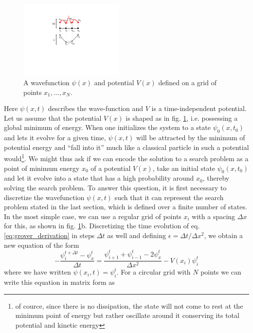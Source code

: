 \begin{figure}
\vspace{-1cm}
\includegraphics[width=5.2cm]{"./material/papers/grover/grover_derivation_schroedinger"}
\caption{A wavefunction $\psi(x)$ and potential $V(x)$ defined on a grid of points $x_1,\hdots,x_N$.}
\label{fig:GroverDerivationSchroedinger}
\end{figure}


Here $\psi(x,t)$ describes the wave-function and $V$ is a time-independent potential. Let us assume that the potential $V(x)$ is shaped as in fig. \ref{fig:GroverDerivationSchroedinger}, i.e. possessing a global minimum of energy. When one initializes the system to a state $\psi_0(x,t_0)$ and lets it evolve for a given time, $\psi(x,t)$ will be attracted by the minimum of potential energy and ``fall into it'' much like a classical particle in such a potential would\footnote{of cource, since there is no dissipation, the state will not come to rest at the minimum point of energy but rather oscillate around it conserving its total potential and kinetic energy}. We might thus ask if we can encode the solution to a search problem as a point of minimum energy $x_0$ of a potential $V(x)$, take an initial state $\psi_0(x,t_0)$ and let it evolve into a state that has a high probability around $x_0$, thereby solving the search problem. To answer this question, it is first necessary to discretize the wavefunction $\psi(x,t)$ such that it can represent the search problem stated in the last section, which is defined over a finite number of states. In the most simple case, we can use a regular grid of points $x_i$ with a spacing $\Delta x$ for this, as shown in fig. \ref{fig:GroverDerivationSchroedinger}b. Discretizing the time evolution of eq. \ref{eq:grover_derivation} in steps $\Delta t$ as well and defining $\epsilon = \Delta t/\Delta x^2$, we obtain a new equation of the form
%
\begin{equation}
-\frac{\psi_i^{t+\Delta t}-\psi_x^{t}}{\Delta t} = \frac{\psi_{i+1}^t+\psi_{i-1}^t-2\psi_x^t}{\Delta x^2} -V(x_i)\psi_i^t
\end{equation}
%
where we have written $\psi(x_i,t)=\psi_i^t$. For a circular grid with $N$ points we can write this equation in matrix form as
